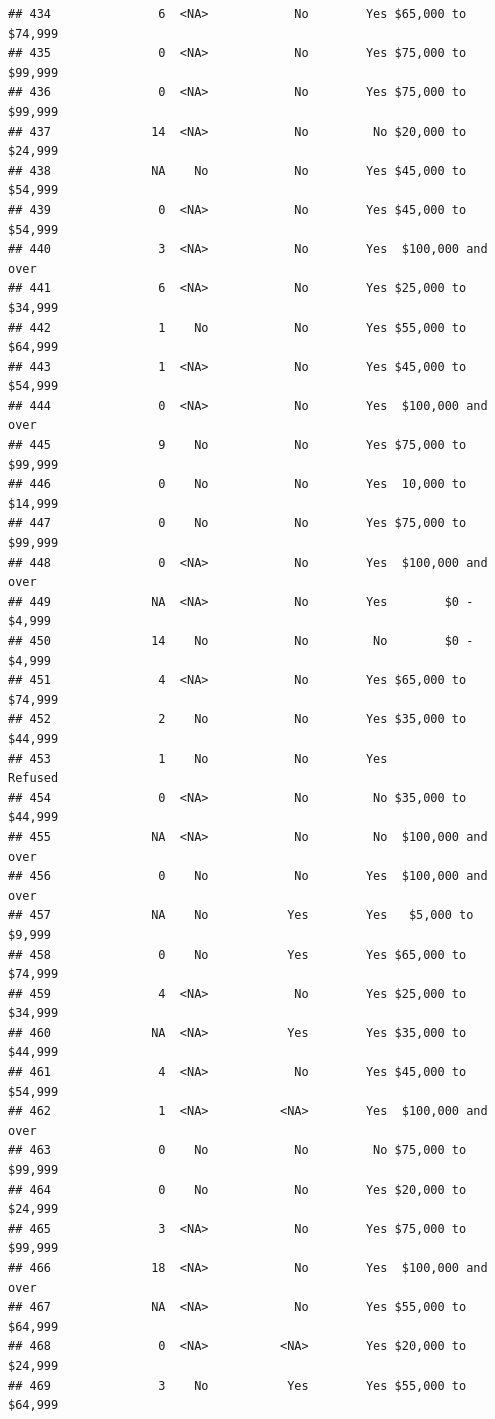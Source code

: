 \documentclass[man]{apa6}
\begin{document}
\begin{verbatim}
## 434               6  <NA>            No        Yes $65,000 to $74,999
## 435               0  <NA>            No        Yes $75,000 to $99,999
## 436               0  <NA>            No        Yes $75,000 to $99,999
## 437              14  <NA>            No         No $20,000 to $24,999
## 438              NA    No            No        Yes $45,000 to $54,999
## 439               0  <NA>            No        Yes $45,000 to $54,999
## 440               3  <NA>            No        Yes  $100,000 and over
## 441               6  <NA>            No        Yes $25,000 to $34,999
## 442               1    No            No        Yes $55,000 to $64,999
## 443               1  <NA>            No        Yes $45,000 to $54,999
## 444               0  <NA>            No        Yes  $100,000 and over
## 445               9    No            No        Yes $75,000 to $99,999
## 446               0    No            No        Yes  10,000 to $14,999
## 447               0    No            No        Yes $75,000 to $99,999
## 448               0  <NA>            No        Yes  $100,000 and over
## 449              NA  <NA>            No        Yes        $0 - $4,999
## 450              14    No            No         No        $0 - $4,999
## 451               4  <NA>            No        Yes $65,000 to $74,999
## 452               2    No            No        Yes $35,000 to $44,999
## 453               1    No            No        Yes            Refused
## 454               0  <NA>            No         No $35,000 to $44,999
## 455              NA  <NA>            No         No  $100,000 and over
## 456               0    No            No        Yes  $100,000 and over
## 457              NA    No           Yes        Yes   $5,000 to $9,999
## 458               0    No           Yes        Yes $65,000 to $74,999
## 459               4  <NA>            No        Yes $25,000 to $34,999
## 460              NA  <NA>           Yes        Yes $35,000 to $44,999
## 461               4  <NA>            No        Yes $45,000 to $54,999
## 462               1  <NA>          <NA>        Yes  $100,000 and over
## 463               0    No            No         No $75,000 to $99,999
## 464               0    No            No        Yes $20,000 to $24,999
## 465               3  <NA>            No        Yes $75,000 to $99,999
## 466              18  <NA>            No        Yes  $100,000 and over
## 467              NA  <NA>            No        Yes $55,000 to $64,999
## 468               0  <NA>          <NA>        Yes $20,000 to $24,999
## 469               3    No           Yes        Yes $55,000 to $64,999

\end{verbatim}
\end{document}
